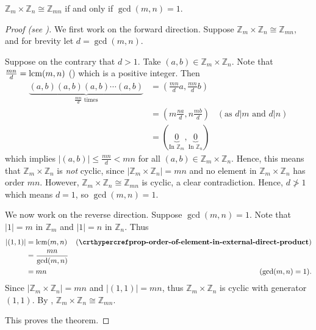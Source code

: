 \begin{theorem}\label{thrm-Zm-cross-Zn-isomorphic-to-Zmn-condition}
    $\mathbb{Z}_m \times \mathbb{Z}_n \cong \mathbb{Z}_{mn}$ if and only if $\gcd(m,n) = 1$.
\end{theorem}
\begin{proof}[Proof (see {\cite[Proposition 13.1 (3)]{humphreys_1996}})]
    We first work on the forward direction. Suppose $\mathbb{Z}_m \times \mathbb{Z}_n \cong \mathbb{Z}_{mn}$, and for brevity let $d = \gcd(m,n)$.
    
    Suppose on the contrary that $d > 1$. Take $(a, b) \in \mathbb{Z}_m \times \mathbb{Z}_n$. Note that $\frac{mn}{d} = \mathrm{lcm}(m,n)$ () which is a positive integer. Then
    \begin{align*}
        \underbrace{(a,b)(a,b)(a,b)\cdots(a,b)}_{\frac{mn}{d}\text{ times}} &= \left(\frac{mn}{d}a, \frac{mn}{d}b\right)\\
        &= \left(m\frac{na}{d}, n\frac{mb}{d}\right) & (\text{as } d \vert m \text{ and } d \vert n)\\
        &= (\underbrace{0}_{\text{In } \mathbb{Z}_m}, \underbrace{0}_{\text{In } \mathbb{Z}_n})
    \end{align*}
    which implies $|(a, b)| \leq \frac{mn}{d} < mn$ for all $(a, b) \in \mathbb{Z}_m \times \mathbb{Z}_n$. Hence, this means that $\mathbb{Z}_m \times \mathbb{Z}_n$ is \textit{not} cyclic, since $|\mathbb{Z}_m \times \mathbb{Z}_n| = mn$ and no element in $\mathbb{Z}_m \times \mathbb{Z}_n$ has order $mn$. However, $\mathbb{Z}_m \times \mathbb{Z}_n \cong \mathbb{Z}_{mn}$ is cyclic, a clear contradiction. Hence, $d \not>1$ which means $d = 1$, so $\gcd(m,n) = 1$.

    We now work on the reverse direction. Suppose $\gcd(m,n) = 1$. Note that $|1| = m$ in $\mathbb{Z}_m$ and $|1| = n$ in $\mathbb{Z}_n$. Thus
    \begin{align*}
        |(1, 1)| &= \lcm(m, n) & (\myref{prop-order-of-element-in-external-direct-product})\\
        &= \frac{mn}{\gcd(m,n)}\\
        &= mn & (\gcd(m,n) = 1).
    \end{align*}
    Since $|\mathbb{Z}_m \times \mathbb{Z}_n| = mn$ and $|(1,1)| = mn$, thus $\mathbb{Z}_m \times \mathbb{Z}_n$ is cyclic with generator $(1,1)$. By , $\mathbb{Z}_m \times \mathbb{Z}_n \cong \mathbb{Z}_{mn}$.

    This proves the theorem.
\end{proof}

